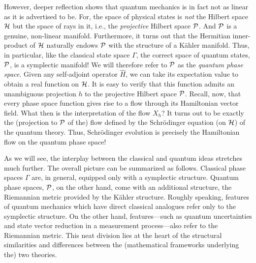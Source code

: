 \documentclass[12pt,aps,eqsecnum,tighten]{revtex4-2}
\def\H{{\cal H}}
\def\P{{\cal P}}
\begin{document}
However, deeper reflection shows that quantum mechanics is in fact not
as linear as it is advertised to be. For, the space of physical states
is {\it not} the Hilbert space $\H$ but the space of rays in it, i.e.,
the {\it projective} Hilbert space $\P$. And $\P$ is a genuine,
non-linear manifold. Furthermore, it turns out that the Hermitian
inner-product of $\H$ naturally endows $\P$ with the structure of a
K\"ahler manifold. Thus, in particular, like the classical state space
$\Gamma$, the correct space of quantum states, $\P$, is a symplectic
manifold! We will therefore refer to $\P$ as the {\it quantum phase
space}. Given any self-adjoint operator $\hat{H}$, we can take its
expectation value to obtain a real function on $\H$. It is easy to
verify that this function admits an unambiguous projection $h$ to the
projective Hilbert space $\P$. Recall, now, that every phase space
function gives rise to a flow through its Hamiltonian vector field.
What then is the interpretation of the flow $X_h$? It turns out
\cite{kibble} to be exactly the (projection to $\P$ of the) flow
defined by the Schr\"odinger equation (on $\H$) of the quantum theory.
Thus, Schr\"odinger evolution is precisely the Hamiltonian flow on the
quantum phase space!

As we will see, the interplay between the classical and quantum ideas
stretches much further. The overall picture can be summarized as
follows. Classical phase spaces $\Gamma$ are, in general, equipped
only with a symplectic structure.  Quantum phase spaces, $\P$, on the
other hand, come with an additional structure, the Riemannian metric
provided by the K\"ahler structure.  Roughly speaking, features of
quantum mechanics which have direct classical analogues refer only to
the symplectic structure.  On the other hand, features---such as
quantum uncertainties and state vector reduction in a measurement
process---also refer to the Riemannian metric. This neat division lies at
the heart of the structural similarities and differences between the
(mathematical frameworks underlying the) two theories.
\end{document}

